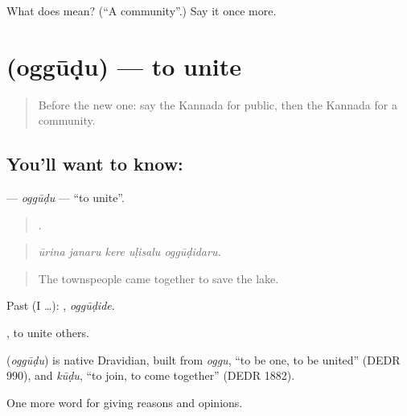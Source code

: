 \begin{tcolorbox}[breakable,colback=teal!4,colframe=teal!35!black,title={Before you move on}]
What does  mean? (\textquotedblleft{}A community\textquotedblright{}.) Say it once more.
\end{tcolorbox}
\section[\texorpdfstring{\kn{ಒಗ್ಗೂಡು} (oggūḍu)}{ಒಗ್ಗೂಡು (oggūḍu)}]{ (oggūḍu) — to unite}

\label{lesson:KA-C397-oggudu}



\begin{quote}
Before the new one: say the Kannada for public, then the Kannada for a community.
\end{quote}

\subsection*{You'll want to know: }
\textbf{} — \emph{oggūḍu} — \textquotedblleft{}to unite\textquotedblright{}.

\begin{quote}
    .
\end{quote}

\begin{quote}
\emph{ūrina janaru kere uḷisalu oggūḍidaru.}
\end{quote}

\begin{quote}
The townspeople came together to save the lake.
\end{quote}

Past (I …): , \emph{oggūḍide}.

, to unite others.

\begin{cousinweb}
\textbf{} (\emph{oggūḍu}) is native Dravidian, built from \emph{oggu}, \textquotedblleft{}to be one, to be united\textquotedblright{} (DEDR 990), and \emph{kūḍu}, \textquotedblleft{}to join, to come together\textquotedblright{} (DEDR 1882).
\end{cousinweb}

\begin{grammarlens}[title={What you've built}]
One more word for giving reasons and opinions.
\end{grammarlens}

